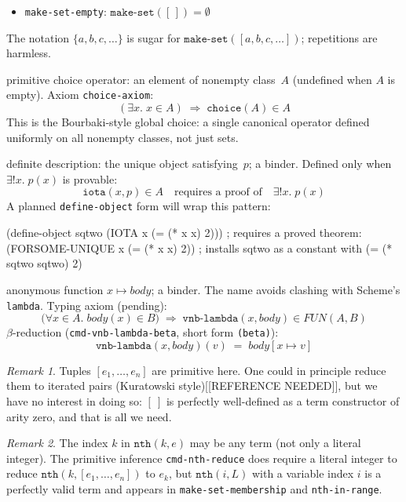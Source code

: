 \documentclass{amsbook}[openany]
\theoremstyle{definition}
\theoremstyle{remark}
\newtheorem{remark}{Remark}[chapter]
\theoremstyle{remark}
\begin{document}
\begin{description}
\begin{itemize}[label=$-$, leftmargin=1cm]
  \item \texttt{make-set-empty}: $\texttt{make-set}([\,]) = \emptyset$
  \end{itemize}
  The notation $\{a,b,c,\ldots\}$ is sugar for $\texttt{make-set}([a,b,c,\ldots])$;
  repetitions are harmless.
\item[\texttt{choice($A$)}] primitive choice operator: an element of nonempty class~$A$
  (undefined when $A$ is empty).  Axiom \texttt{choice-axiom}:
  \[
    (\exists x.\; x \in A) \;\Longrightarrow\; \texttt{choice}(A) \in A
  \]
  This is the Bourbaki-style global choice: a single canonical operator
  defined uniformly on all nonempty classes, not just sets.
\item[\texttt{iota($x$, $p$)}] definite description: the unique object satisfying~$p$;
  a binder.  Defined only when $\exists! x.\; p(x)$ is provable:
  \[
    \texttt{iota}(x, p) \in A \quad\text{requires a proof of}\quad \exists! x.\; p(x)
  \]
  A planned \texttt{define-object} form will wrap this pattern:
\begin{VNBsnip}
(define-object sqtwo (IOTA x (= (* x x) 2)))
; requires a proved theorem: (FORSOME-UNIQUE x (= (* x x) 2))
; installs sqtwo as a constant with (= (* sqtwo sqtwo) 2)
\end{VNBsnip}
\item[\texttt{vnb-lambda($x$, $\mathit{body}$)}] anonymous function $x \mapsto \mathit{body}$;
  a binder.  The name avoids clashing with Scheme's \texttt{lambda}.
  Typing axiom (pending):
  \[
    \bigl(\forall x \in A.\; \mathit{body}(x) \in B\bigr)
    \;\Longrightarrow\;
    \texttt{vnb-lambda}(x, \mathit{body}) \in \mathit{FUN}(A,B)
  \]
  $\beta$-reduction (\texttt{cmd-vnb-lambda-beta}, short form \texttt{(beta)}):
  \[
    \texttt{vnb-lambda}(x, \mathit{body})(v) \;=\; \mathit{body}[x \mapsto v]
  \]
\end{description}

\begin{remark}
Tuples $[e_1,\ldots,e_n]$ are primitive here.  One could in principle reduce
them to iterated pairs (Kuratowski style)[[REFERENCE NEEDED]], but we have no interest in doing so:
$[\ ]$ is perfectly well-defined as a term constructor of arity zero, and that
is all we need.
\end{remark}

\begin{remark}
The index $k$ in $\texttt{nth}(k, e)$ may be any term (not only a literal
integer).  The primitive inference \texttt{cmd-nth-reduce} does require a
literal integer to reduce $\texttt{nth}(k, [e_1,\ldots,e_n])$ to $e_k$, but
$\texttt{nth}(i, L)$ with a variable index $i$ is a perfectly valid term and
appears in \texttt{make-set-membership} and \texttt{nth-in-range}.
\end{remark}
\end{document}
